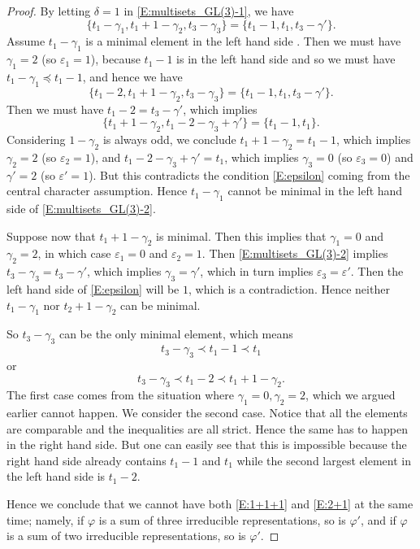 \documentclass[11pt]{amsart}
\theoremstyle{plain}
\theoremstyle{definition}
\numberwithin{equation}{section}
\newcommand{\ep}{\varepsilon}
\begin{document}
\begin{proof}
By letting $\delta=1$ in \eqref{E:multisets_GL(3)-1}, we have
\begin{equation}\label{E:multisets_GL(3)-2}
\{t_1-\gamma_1, t_1+1-\gamma_2, t_3-\gamma_3\}
=\{t_1-1, t_1, t_3-\gamma'\}.
\end{equation}
Assume $t_1-\gamma_1$ is a minimal element in the left hand
side . Then we must have $\gamma_1=2$ (so $\ep_1=1$), because $t_1-1$
is in the left hand side and so we must have
$t_1-\gamma_1\preceq t_1-1$, and hence we have
\[
\{t_1-2, t_1+1-\gamma_2, t_3-\gamma_3\}
=\{t_1-1, t_1, t_3-\gamma'\}.
\]
Then we must have $t_1-2=t_3-\gamma'$, which implies
\[
\{t_1+1-\gamma_2, t_1-2-\gamma_3+\gamma'\}
=\{t_1-1, t_1\}.
\]
Considering $1-\gamma_2$ is always odd, we conclude
$t_1+1-\gamma_2=t_1-1$, which implies $\gamma_2=2$ (so $\ep_2=1$), and
$t_1-2-\gamma_3+\gamma'=t_1$, which implies $\gamma_3=0$ (so
$\ep_3=0$) and $\gamma'=2$ (so $\ep'=1$). But this contradicts the
condition \eqref{E:epsilon} coming from the central character
assumption. Hence
$t_1-\gamma_1$ cannot be minimal in the left hand side of
\eqref{E:multisets_GL(3)-2}. 

Suppose now that $t_1+1-\gamma_2$ is minimal.  Then this implies that $\gamma_1=0$
and $\gamma_2=2$, in which case $\ep_1=0$ and
$\ep_2=1$. Then \eqref{E:multisets_GL(3)-2} 
implies $t_3-\gamma_3=t_3-\gamma'$, which implies $\gamma_3=\gamma'$, which in turn implies 
$\ep_3=\ep'$. Then the left hand side of \eqref{E:epsilon}
will be $1$, which is a contradiction. Hence neither $t_1-\gamma_1$
nor $t_2+1-\gamma_2$ can be minimal.

So $t_3-\gamma_3$ can be the only minimal
element, which means
\[
t_3-\gamma_3\prec t_1-1\prec t_1
\] or
\[
t_3-\gamma_3\prec t_1-2\prec t_1+1-\gamma_2.
\]
The first case comes from the situation where $\gamma_1 = 0,
\gamma_2 = 2$, which we argued earlier cannot happen.  We consider the
second case. Notice that all the elements are comparable and the inequalities
are all strict. Hence the same has to happen in the right hand
side. But one can easily see that this is impossible because the right
hand side already contains $t_1-1$ and $t_1$ while the second largest
element in the left hand side is $t_1-2$. 

Hence we conclude that we cannot have both \eqref{E:1+1+1} and
\eqref{E:2+1} at the same time; namely, if $\varphi$ is a sum of three irreducible
representations, so is $\varphi'$, and if $\varphi$ is a sum of two
irreducible representations, so is $\varphi'$. 


\end{proof}
\end{document}
